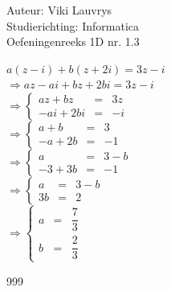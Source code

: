 \documentclass[a4paper]{article}
\begin{document}
  
\noindent \large Auteur: Viki Lauvrys        \\
\noindent \large Studierichting: Informatica \\
\noindent \large Oefeningenreeks 1D nr. 1.3 \\

\medskip

\normalsize

$ a(z-i) + b(z+2i) = 3z -i $ \\

$ \Rightarrow az - ai + bz + 2bi = 3z -i $ \\

$\Rightarrow\left\{
	\begin{array}{lll}
		az + bz & = & 3z \\
		-ai + 2bi & = &  -i
	\end{array}
\right . $ \\

$\Rightarrow\left\{
	\begin{array}{lll}
		a + b & = & 3 \\
		-a + 2b & = &  -1
	\end{array}
\right . $ \\

$\Rightarrow\left\{
	\begin{array}{lll}
		a & = & 3 - b \\
		-3 + 3b & = &  -1
	\end{array}
\right . $ \\

$\Rightarrow\left\{
	\begin{array}{lll}
		a & = & 3 - b \\
		3b & = &  2
	\end{array}
\right . $ \\

$\Rightarrow\left\{
	\begin{array}{lll}
		a & = & \dfrac{7}{3} \\
		b & = &  \dfrac{2}{3}
	\end{array}
\right . $ \\

\begin{thebibliography}{999}
\end{thebibliography}
\end{document}
